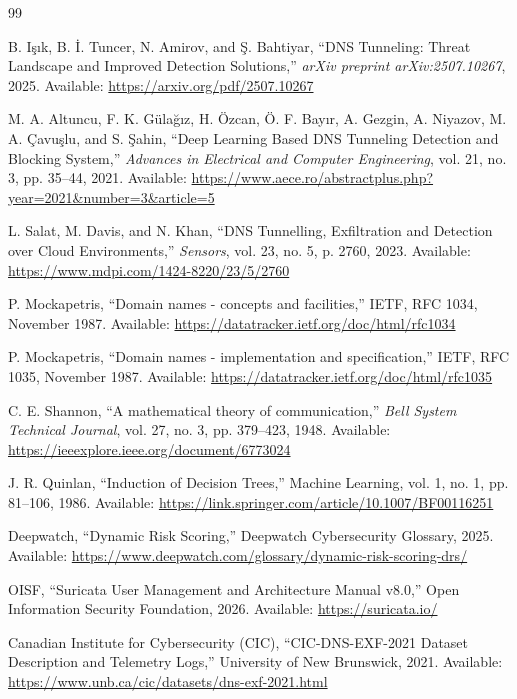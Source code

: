 \documentclass[14pt, a4paper, oneside]{report}
\begin{document}
\begin{thebibliography}{99}

B. Işık, B. İ. Tuncer, N. Amirov, and Ş. Bahtiyar, ``DNS Tunneling: Threat Landscape and Improved Detection Solutions,'' \textit{arXiv preprint arXiv:2507.10267}, 2025. Available: \url{https://arxiv.org/pdf/2507.10267}

M. A. Altuncu, F. K. Gülağız, H. Özcan, Ö. F. Bayır, A. Gezgin, A. Niyazov, M. A. Çavuşlu, and S. Şahin, ``Deep Learning Based DNS Tunneling Detection and Blocking System,'' \textit{Advances in Electrical and Computer Engineering}, vol. 21, no. 3, pp. 35--44, 2021. Available: \url{https://www.aece.ro/abstractplus.php?year=2021&number=3&article=5}

L. Salat, M. Davis, and N. Khan, ``DNS Tunnelling, Exfiltration and Detection over Cloud Environments,'' \textit{Sensors}, vol. 23, no. 5, p. 2760, 2023. Available: \url{https://www.mdpi.com/1424-8220/23/5/2760}

P. Mockapetris, ``Domain names - concepts and facilities,'' IETF, RFC 1034, November 1987. Available: \url{https://datatracker.ietf.org/doc/html/rfc1034}

P. Mockapetris, ``Domain names - implementation and specification,'' IETF, RFC 1035, November 1987. Available: \url{https://datatracker.ietf.org/doc/html/rfc1035}

C. E. Shannon, ``A mathematical theory of communication,'' \textit{Bell System Technical Journal}, vol. 27, no. 3, pp. 379--423, 1948. Available: \url{https://ieeexplore.ieee.org/document/6773024}

J. R. Quinlan,
``Induction of Decision Trees,''
Machine Learning,
vol. 1, no. 1,
pp. 81--106,
1986.
Available:
\url{https://link.springer.com/article/10.1007/BF00116251}

Deepwatch, ``Dynamic Risk Scoring,'' Deepwatch Cybersecurity Glossary, 2025. Available: \url{https://www.deepwatch.com/glossary/dynamic-risk-scoring-drs/}


OISF, ``Suricata User Management and Architecture Manual v8.0,'' Open Information Security Foundation, 2026. Available: \url{https://suricata.io/}

Canadian Institute for Cybersecurity (CIC), ``CIC-DNS-EXF-2021 Dataset Description and Telemetry Logs,'' University of New Brunswick, 2021. Available: \url{https://www.unb.ca/cic/datasets/dns-exf-2021.html}

\end{thebibliography}
\end{document}
